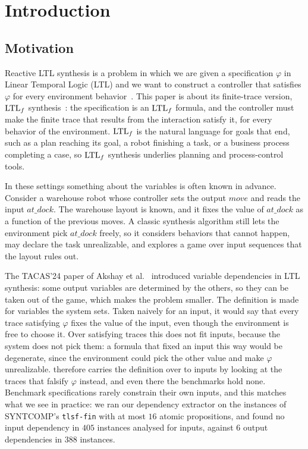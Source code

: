 \section{Introduction}\label{sec:intro}

\subsection{Motivation}
Reactive LTL synthesis is a problem in which we are given a specification $\varphi$ in Linear Temporal Logic (LTL) and we want to construct a controller that satisfies $\varphi$ for every environment behavior~\cite{PnueliRosner1989}.
This paper is about its finite-trace version, $\text{LTL}_f$ synthesis~\cite{DeGiacomoVardi2015}: the specification is an $\text{LTL}_f$ formula, and the controller must make the finite trace that results from the interaction satisfy it, for every behavior of the environment.
$\text{LTL}_f$ is the natural language for goals that end, such as a plan reaching its goal, a robot finishing a task, or a business process completing a case, so $\text{LTL}_f$ synthesis underlies planning and process-control tools.

In these settings something about the variables is often known in advance.
Consider a warehouse robot whose controller sets the output $\mathit{move}$ and reads the input $\mathit{at\_dock}$.
The warehouse layout is known, and it fixes the value of $\mathit{at\_dock}$ as a function of the previous moves.
A classic synthesis algorithm still lets the environment pick $\mathit{at\_dock}$ freely, so it considers behaviors that cannot happen, may declare the task unrealizable, and explores a game over input sequences that the layout rules out.

The TACAS'24 paper of Akshay et al.~\cite{AkshayBCF2024} introduced variable dependencies in LTL synthesis: some output variables are determined by the others, so they can be taken out of the game, which makes the problem smaller.
The definition is made for variables the system sets.
Taken naively for an input, it would say that every trace satisfying $\varphi$ fixes the value of the input, even though the environment is free to choose it.
Over satisfying traces this does not fit inputs, because the system does not pick them: a formula that fixed an input this way would be degenerate, since the environment could pick the other value and make $\varphi$ unrealizable.
 therefore carries the definition over to inputs by looking at the traces that falsify $\varphi$ instead, and even there the benchmarks hold none.
Benchmark specifications rarely constrain their own inputs, and this matches what we see in practice: we ran our dependency extractor  on the instances of SYNTCOMP's \texttt{tlsf-fin} with at most $16$ atomic propositions, and found no input dependency in $405$ instances analysed for inputs, against $6$ output dependencies in $388$ instances.

